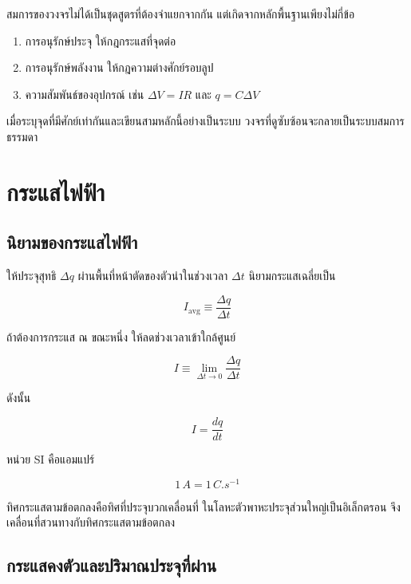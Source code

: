 \begin{tcolorbox}[title={แนวคิดสำคัญของบทนี้}]
สมการของวงจรไม่ได้เป็นชุดสูตรที่ต้องจำแยกจากกัน แต่เกิดจากหลักพื้นฐานเพียงไม่กี่ข้อ

\begin{enumerate}
    \item การอนุรักษ์ประจุ ให้กฎกระแสที่จุดต่อ
    \item การอนุรักษ์พลังงาน ให้กฎความต่างศักย์รอบลูป
    \item ความสัมพันธ์ของอุปกรณ์ เช่น $\Delta V=IR$ และ $q=C\Delta V$
\end{enumerate}

เมื่อระบุจุดที่มีศักย์เท่ากันและเขียนสามหลักนี้อย่างเป็นระบบ วงจรที่ดูซับซ้อนจะกลายเป็นระบบสมการธรรมดา
\end{tcolorbox}

\section{กระแสไฟฟ้า}

\subsection{นิยามของกระแสไฟฟ้า}

ให้ประจุสุทธิ $\Delta q$ ผ่านพื้นที่หน้าตัดของตัวนำในช่วงเวลา $\Delta t$ นิยามกระแสเฉลี่ยเป็น

\[
I_{\text{avg}}\equiv\frac{\Delta q}{\Delta t}
\]

ถ้าต้องการกระแส ณ ขณะหนึ่ง ให้ลดช่วงเวลาเข้าใกล้ศูนย์

\[
I\equiv\lim_{\Delta t\to 0}\frac{\Delta q}{\Delta t}
\]

ดังนั้น

\begin{tcolorbox}[title={นิยามกระแสไฟฟ้า}]
\[
\boxed{I=\frac{dq}{dt}}
\]

หน่วย SI คือแอมแปร์

\[
1\,\si{A}=1\,\si{C.s^{-1}}
\]
\end{tcolorbox}

ทิศกระแสตามข้อตกลงคือทิศที่ประจุบวกเคลื่อนที่ ในโลหะตัวพาหะประจุส่วนใหญ่เป็นอิเล็กตรอน จึงเคลื่อนที่สวนทางกับทิศกระแสตามข้อตกลง

\subsection{กระแสคงตัวและปริมาณประจุที่ผ่าน}


